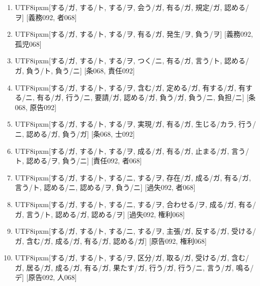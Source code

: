 \begin{enumerate}
\item \begin{CJK}{UTF8}{ipxm}[する/ガ, する/ト, する/ヲ, 会う/ガ, 有る/ガ, 規定/ガ, 認める/ヲ] [義務092, 者068]\end{CJK}
\item \begin{CJK}{UTF8}{ipxm}[する/ガ, する/ト, する/ヲ, 有る/ガ, 発生/ヲ, 負う/ヲ] [義務092, 孤児068]\end{CJK}
\item \begin{CJK}{UTF8}{ipxm}[する/ガ, する/ト, する/ヲ, つく/ニ, 有る/ガ, 言う/ト, 認める/ガ, 負う/ト, 負う/ニ] [条068, 責任092]\end{CJK}
\item \begin{CJK}{UTF8}{ipxm}[する/ガ, する/ト, する/ヲ, 含む/ガ, 定める/ガ, 有する/ガ, 有する/ニ, 有る/ガ, 行う/ニ, 要請/ガ, 認める/ガ, 負う/ガ, 負う/ニ, 負担/ニ] [条068, 原告092]\end{CJK}
\item \begin{CJK}{UTF8}{ipxm}[する/ガ, する/ト, する/ヲ, 実現/ガ, 有る/ガ, 生じる/カラ, 行う/ニ, 認める/ガ, 負う/ガ] [条068, 士092]\end{CJK}
\item \begin{CJK}{UTF8}{ipxm}[する/ガ, する/ト, する/ヲ, 成る/ガ, 有る/ガ, 止まる/ガ, 言う/ト, 認める/ヲ, 負う/ニ] [責任092, 者068]\end{CJK}
\item \begin{CJK}{UTF8}{ipxm}[する/ガ, する/ト, する/ニ, する/ヲ, 存在/ガ, 成る/ガ, 有る/ガ, 言う/ト, 認める/ニ, 認める/ヲ, 負う/ニ] [過失092, 者068]\end{CJK}
\item \begin{CJK}{UTF8}{ipxm}[する/ガ, する/ト, する/ニ, する/ヲ, 合わせる/ヲ, 成る/ガ, 有る/ガ, 言う/ト, 認める/ガ, 認める/ヲ] [過失092, 権利068]\end{CJK}
\item \begin{CJK}{UTF8}{ipxm}[する/ガ, する/ト, する/ニ, する/ヲ, 主張/ガ, 反する/ガ, 受ける/ガ, 含む/ガ, 成る/ガ, 有る/ガ, 認める/ガ] [原告092, 権利068]\end{CJK}
\item \begin{CJK}{UTF8}{ipxm}[する/ガ, する/ト, する/ヲ, 区分/ガ, 取る/ガ, 受ける/ガ, 含む/ガ, 居る/ガ, 成る/ガ, 有る/ガ, 果たす/ガ, 行う/ガ, 行う/ニ, 言う/ガ, 鳴る/デ] [原告092, 人068]\end{CJK}

\end{enumerate}
